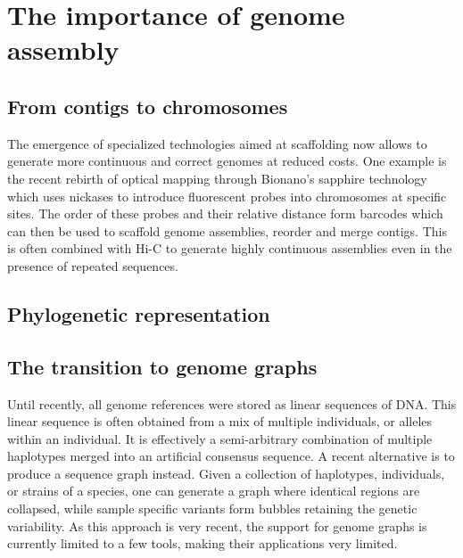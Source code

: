 
\chapter{The importance of genome assembly} %

\label{ch:01-03} %


\section{From contigs to chromosomes}

The emergence of specialized technologies aimed at scaffolding now allows to generate more continuous and correct genomes at reduced costs. One example is the recent rebirth of optical mapping through Bionano's sapphire technology which uses nickases to introduce fluorescent probes into chromosomes at specific sites. The order of these probes and their relative distance form barcodes which can then be used to scaffold genome assemblies, reorder and merge contigs. This is often combined with Hi-C to generate highly continuous assemblies even in the presence of repeated sequences.


\section{Phylogenetic representation}

\section{The transition to genome graphs}

Until recently, all genome references were stored as linear sequences of DNA. This linear sequence is often obtained from a mix of multiple individuals, or alleles within an individual. It is effectively a semi-arbitrary combination of multiple haplotypes merged into an artificial consensus sequence. A recent alternative is to produce a sequence graph instead. Given a collection of haplotypes, individuals, or strains of a species, one can generate a graph where identical regions are collapsed, while sample specific variants form bubbles retaining the genetic variability. As this approach is very recent, the support for genome graphs is currently limited to a few tools, making their applications very limited.

